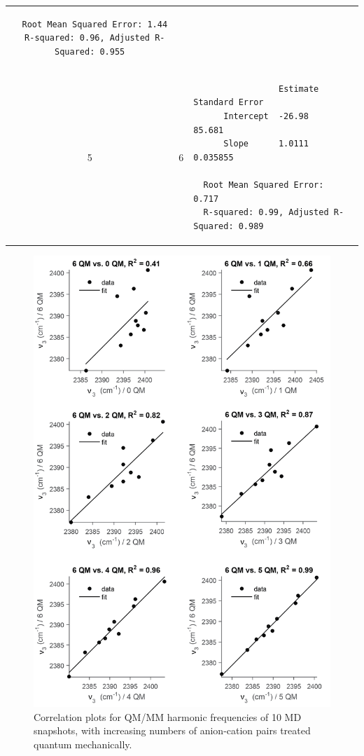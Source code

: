 \begin{table}
\begin{tabular}{ccl}
\begin{minipage}{4.5in}
\begin{verbatim}
  Root Mean Squared Error: 1.44
  R-squared: 0.96, Adjusted R-Squared: 0.955
\end{verbatim}
            \end{minipage} \\
    5 & 6 &
            \begin{minipage}{4.5in}
\begin{verbatim}
                 Estimate   Standard Error
      Intercept  -26.98        85.681
      Slope      1.0111      0.035855

  Root Mean Squared Error: 0.717
  R-squared: 0.99, Adjusted R-Squared: 0.989
\end{verbatim}
            \end{minipage} \\
    \bottomrule
  \end{tabular}
\end{table}

\begin{figure}
  \centering
  \includegraphics[scale=0.85]{./paper_02/figureS5.png}%
  \caption[Self-correlation of QM/MM frequencies with increasing QM region size]{Correlation plots for QM/MM harmonic frequencies of \num{10} MD snapshots, with increasing numbers of anion-cation pairs treated quantum mechanically.}
  \label{paper_02:fig:S5}
\end{figure}

